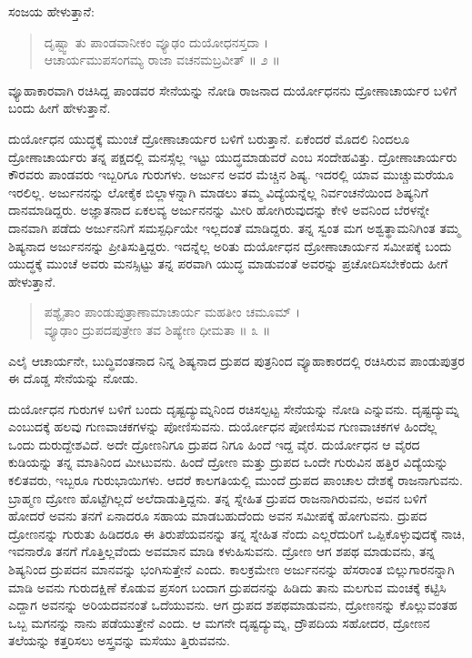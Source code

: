 ಸಂಜಯ ಹೇಳುತ್ತಾನೆ:

\begin{verse}
ದೃಷ್ಟ್ವಾ ತು ಪಾಂಡವಾನೀಕಂ ವ್ಯೂಢಂ ದುಯೋಧನಸ್ತದಾ ।\\ಆಚಾರ್ಯಮುಪಸಂಗಮ್ಯ ರಾಜಾ ವಚನಮಬ್ರವೀತ್ \num{॥ ೨ ॥}
\end{verse}

{\small ವ್ಯೂಹಾಕಾರವಾಗಿ ರಚಿಸಿದ್ದ ಪಾಂಡವರ ಸೇನೆಯನ್ನು ನೋಡಿ ರಾಜನಾದ ದುರ್ಯೋಧನನು ದ್ರೋಣಾಚಾರ್ಯರ ಬಳಿಗೆ ಬಂದು ಹೀಗೆ ಹೇಳುತ್ತಾನೆ.}

ದುರ್ಯೋಧನ ಯುದ್ಧಕ್ಕೆ ಮುಂಚೆ ದ್ರೋಣಾಚಾರ್ಯರ ಬಳಿಗೆ ಬರುತ್ತಾನೆ. ಏಕೆಂದರೆ ಮೊದಲಿ ನಿಂದಲೂ ದ್ರೋಣಾಚಾರ್ಯರು ತನ್ನ ಪಕ್ಷದಲ್ಲಿ ಮನಸ್ಸೆಲ್ಲ ಇಟ್ಟು ಯುದ್ಧಮಾಡುವರೆ ಎಂಬ ಸಂದೇಹವಿತ್ತು. ದ್ರೋಣಾಚಾರ್ಯರು ಕೌರವರು ಪಾಂಡವರು ಇಬ್ಬರಿಗೂ ಗುರುಗಳು. ಅರ್ಜುನ ಅವರ ಮೆಚ್ಚಿನ ಶಿಷ್ಯ. ಇದರಲ್ಲಿ ಯಾವ ಮುಚ್ಚುಮರೆಯೂ ಇರಲಿಲ್ಲ. ಅರ್ಜುನನನ್ನು ಲೋಕೈಕ ಬಿಲ್ಲಾಳನ್ನಾಗಿ ಮಾಡಲು ತಮ್ಮ ವಿದ್ಯೆಯನ್ನೆಲ್ಲ ನಿರ್ವಂಚನೆಯಿಂದ ಶಿಷ್ಯನಿಗೆ ದಾನಮಾಡಿದ್ದರು. ಅಜ್ಞಾತನಾದ ಏಕಲವ್ಯ ಅರ್ಜುನನನ್ನು ಮೀರಿ ಹೋಗಿರುವುದನ್ನು ಕೇಳಿ ಅವನಿಂದ ಬೆರಳನ್ನೇ ದಾನವಾಗಿ ಪಡೆದು ಅರ್ಜುನನಿಗೆ ಸಮಸ್ಪರ್ಧಿಯೇ ಇಲ್ಲದಂತೆ ಮಾಡಿದ್ದರು. ತನ್ನ ಸ್ವಂತ ಮಗ ಅಶ್ವತ್ಥಾಮನಿಗಿಂತ ತಮ್ಮ ಶಿಷ್ಯನಾದ ಅರ್ಜುನನನ್ನು ಪ್ರೀತಿಸುತ್ತಿದ್ದರು. ಇದನ್ನೆಲ್ಲ ಅರಿತು ದುರ್ಯೋಧನ ದ್ರೋಣಾಚಾರ್ಯನ ಸಮೀಪಕ್ಕೆ ಬಂದು ಯುದ್ಧಕ್ಕೆ ಮುಂಚೆ ಅವರು ಮನಸ್ಸಿಟ್ಟು ತನ್ನ ಪರವಾಗಿ ಯುದ್ಧ ಮಾಡುವಂತೆ ಅವರನ್ನು ಪ್ರಚೋದಿಸಬೇಕೆಂದು ಹೀಗೆ ಹೇಳುತ್ತಾನೆ.

\begin{verse}
ಪಶ್ಯೈತಾಂ ಪಾಂಡುಪುತ್ರಾಣಾಮಾಚಾರ್ಯ ಮಹತೀಂ ಚಮೂಮ್ ।\\ವ್ಯೂಢಾಂ ದ್ರುಪದಪುತ್ರೇಣ ತವ ಶಿಷ್ಯೇಣ ಧೀಮತಾ \num{॥ ೩ ॥}
\end{verse}

{\small ಎಲೈ ಆಚಾರ್ಯನೇ, ಬುದ್ಧಿವಂತನಾದ ನಿನ್ನ ಶಿಷ್ಯನಾದ ದ್ರುಪದ ಪುತ್ರನಿಂದ ವ್ಯೂಹಾಕಾರದಲ್ಲಿ ರಚಿಸಿರುವ ಪಾಂಡುಪುತ್ರರ ಈ ದೊಡ್ಡ ಸೇನೆಯನ್ನು ನೋಡು.}

ದುರ್ಯೋಧನ ಗುರುಗಳ ಬಳಿಗೆ ಬಂದು ದೃಷ್ಟದ್ಯುಮ್ನನಿಂದ ರಚಿಸಲ್ಪಟ್ಟ ಸೇನೆಯನ್ನು ನೋಡಿ ಎನ್ನುವನು. ದೃಷ್ಟದ್ಯುಮ್ನ ಎಂಬುದಕ್ಕೆ ಹಲವು ಗುಣವಾಚಕಗಳನ್ನು ಪೋಣಿಸುವನು. ದುರ್ಯೋಧನ ಪೋಣಿಸುವ ಗುಣವಾಚಕಗಳ ಹಿಂದೆಲ್ಲ ಒಂದು ದುರುದ್ದೇಶವಿದೆ. ಅದೇ ದ್ರೋಣನಿಗೂ ದ್ರುಪದ ನಿಗೂ ಹಿಂದೆ ಇದ್ದ ವೈರ. ದುರ್ಯೋಧನ ಆ ವೈರದ ಕುಡಿಯನ್ನು ತನ್ನ ಮಾತಿನಿಂದ ಮೀಟುವನು. ಹಿಂದೆ ದ್ರೋಣ ಮತ್ತು ದ್ರುಪದ ಒಂದೇ ಗುರುವಿನ ಹತ್ತಿರ ವಿದ್ಯೆಯನ್ನು ಕಲಿತವರು, ಇಬ್ಬರೂ ಗುರುಭಾಯಿಗಳು. ಆದರೆ ಕಾಲಗತಿಯಲ್ಲಿ ಮುಂದೆ ದ್ರುಪದ ಪಾಂಚಾಲ ದೇಶಕ್ಕೆ ರಾಜನಾಗುವನು. ಬ್ರಾಹ್ಮಣ ದ್ರೋಣ ಹೊಟ್ಟೆಗಿಲ್ಲದೆ ಅಲೆದಾಡುತ್ತಿದ್ದನು. ತನ್ನ ಸ್ನೇಹಿತ ದ್ರುಪದ ರಾಜನಾಗಿರುವನು, ಅವನ ಬಳಿಗೆ ಹೋದರೆ ಅವನು ತನಗೆ ಏನಾದರೂ ಸಹಾಯ ಮಾಡಬಹುದೆಂದು ಅವನ ಸಮೀಪಕ್ಕೆ ಹೋಗುವನು. ದ್ರುಪದ ದ್ರೋಣನನ್ನು ಗುರುತು ಹಿಡಿದರೂ ಈ ತಿರುಪೆಯವನನ್ನು ತನ್ನ ಸ್ನೇಹಿತ ನೆಂದು ಎಲ್ಲರೆದುರಿಗೆ ಒಪ್ಪಿಕೊಳ್ಳುವುದಕ್ಕೆ ನಾಚಿ, ಇವನಾರೊ ತನಗೆ ಗೊತ್ತಿಲ್ಲವೆಂದು ಅವಮಾನ ಮಾಡಿ ಕಳುಹಿಸುವನು. ದ್ರೋಣ ಆಗ ಶಪಥ ಮಾಡುವನು, ತನ್ನ ಶಿಷ್ಯನಿಂದ ದ್ರುಪದನ ಮಾನವನ್ನು ಭಂಗಿಸುತ್ತೇನೆ ಎಂದು. ಕಾಲಕ್ರಮೇಣ ಅರ್ಜುನನನ್ನು ಹೆಸರಾಂತ ಬಿಲ್ಲುಗಾರನನ್ನಾಗಿ ಮಾಡಿ ಅವನು ಗುರುದಕ್ಷಿಣೆ ಕೊಡುವ ಪ್ರಸಂಗ ಬಂದಾಗ ದ್ರುಪದನನ್ನು ಹಿಡಿದು ತಾನು ಮಲಗುವ ಮಂಚಕ್ಕೆ ಕಟ್ಟಿಸಿ ಎದ್ದಾಗ ಅವನನ್ನು ಅರಿಯದವನಂತೆ ಒದೆಯುವನು. ಆಗ ದ್ರುಪದ ಶಪಥಮಾಡುವನು, ದ್ರೋಣನನ್ನು ಕೊಲ್ಲುವಂತಹ ಒಬ್ಬ ಮಗನನ್ನು ನಾನು ಪಡೆಯುತ್ತೇನೆ ಎಂದು. ಆ ಮಗನೇ ದೃಷ್ಟದ್ಯುಮ್ನ, ದ್ರೌಪದಿಯ ಸಹೋದರ, ದ್ರೋಣನ ತಲೆಯನ್ನು ಕತ್ತರಿಸಲು ಅಸ್ತ್ರವನ್ನು ಮಸೆಯು ತ್ತಿರುವವನು.


